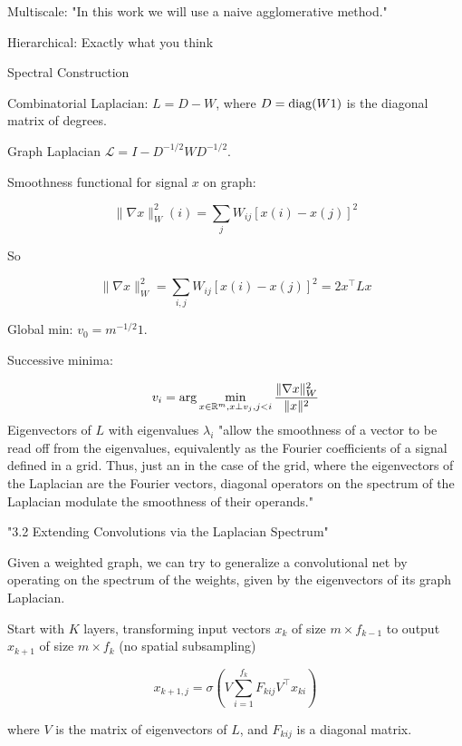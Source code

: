 \documentclass[english]{article}
\begin{document}
\item Multiscale: "In this work we will use a naive agglomerative method."

\item Hierarchical: Exactly what you think

\eitem 


\item Spectral Construction

\bitem 

\item Combinatorial Laplacian: $L = D-W$, where $D = \operatorname{diag}(W1)$ is the diagonal matrix of degrees. 

Graph Laplacian $\mathcal{L} = I-D^{-1/2}WD^{-1/2}$. 

\item Smoothness functional for signal $x$ on graph:

$$\|\nabla x\|_W^2(i) = \sum_j W_{ij} [x(i)-x(j)]^2$$

So 

$$\|\nabla x\|_W^2 
= \sum_{i,j} W_{ij} [x(i)-x(j)]^2
= 2x^\top L x
$$


\item Global min: $v_0 = m^{-1/2}1$.

Successive minima: 

$$v_i =\arg\min_{x\in\mathbb{R}^m, x\perp{v_j}, j<i} 
\frac{\|\nabla x\|_W^2}{\|x\|^2}
$$
Eigenvectors of $L$ with eigenvalues $\lambda_i$ "allow the smoothness of a vector to be read off
from the eigenvalues, equivalently as the Fourier coefficients of a signal defined
in a grid. Thus, just an in the case of the grid, where the eigenvectors of the Laplacian are the
Fourier vectors, diagonal operators on the spectrum of the Laplacian modulate the smoothness of
their operands."

\item "3.2 Extending Convolutions via the Laplacian Spectrum"

Given a weighted graph, we can try to
generalize a convolutional net by operating on the spectrum of the weights, given by the eigenvectors of its graph Laplacian.


\bitem 

\item Start with $K$ layers, transforming input vectors $x_k$ of size $m\times f_{k-1}$ to output $x_{k+1}$ of size $m\times f_{k}$ (no spatial subsampling)

$$
x_{k+1,j}
= \sigma 
(
V \sum_{i=1}^{f_k} F_{kij} V^\top x_{ki}
)
$$

where $V$ is the matrix of eigenvectors of $L$, and $F_{kij}$ is a diagonal matrix. 
\end{document}
